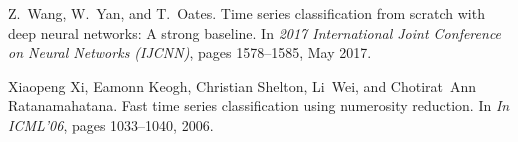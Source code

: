 \documentclass{article}
\begin{document}
\begin{thebibliography}{10}
Z.~Wang, W.~Yan, and T.~Oates.
\newblock Time series classification from scratch with deep neural networks: A
  strong baseline.
\newblock In {\em 2017 International Joint Conference on Neural Networks
  (IJCNN)}, pages 1578--1585, May 2017.

Xiaopeng Xi, Eamonn Keogh, Christian Shelton, Li~Wei, and Chotirat~Ann
  Ratanamahatana.
\newblock Fast time series classification using numerosity reduction.
\newblock In {\em In ICML’06}, pages 1033--1040, 2006.

\end{thebibliography}
\end{document}
